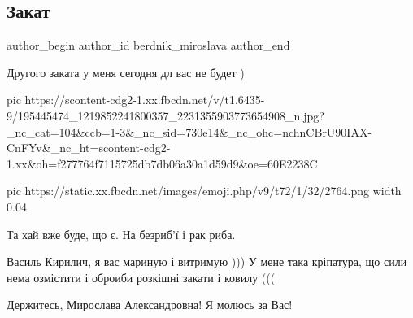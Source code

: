  
 
 
 
 
 
\subsection{Закат}
\label{sec:04_06_2021.fb.berdnik_miroslava.1.zakat}
\ifcmt
 author_begin
   author_id berdnik_miroslava
 author_end
\fi

Другого заката у меня сегодня дл вас не будет )

\ifcmt
  pic https://scontent-cdg2-1.xx.fbcdn.net/v/t1.6435-9/195445474_1219852241800357_2231355903773654908_n.jpg?_nc_cat=104&ccb=1-3&_nc_sid=730e14&_nc_ohc=nchnCBrU90IAX-CnFYv&_nc_ht=scontent-cdg2-1.xx&oh=f277764f7115725db7db06a30a1d59d9&oe=60E2238C
\fi

\begin{itemize}
\ifcmt
  pic https://static.xx.fbcdn.net/images/emoji.php/v9/t72/1/32/2764.png
	width 0.04
\fi


Та хай вже буде, що є. На безриб'ї і рак риба.


Василь Кирилич, я вас мариную і витримую ))) У мене така кріпатура, що сили нема озмістити і оброиби розкішні закати і ковилу (((


Держитесь, Мирослава Александровна! Я молюсь за Вас!

\end{itemize}

